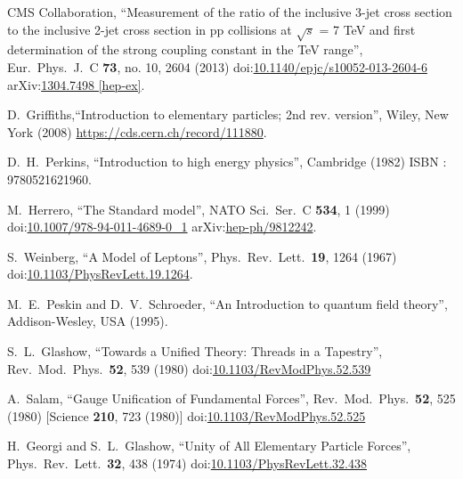 \begin{thebibliography}{99}

CMS Collaboration, ``Measurement of the ratio of the inclusive 3-jet cross section to the inclusive 2-jet cross section in pp collisions at $\sqrt{s}$ = 7 TeV and first determination of the strong coupling constant in the TeV range'', Eur.\ Phys.\ J.\ C {\bf 73}, no. 10, 2604 (2013) doi:\href{http://dx.doi.org/10.1140/epjc/s10052-013-2604-6}{10.1140/epjc/s10052-013-2604-6} arXiv:\href{https://arxiv.org/abs/1304.7498}{1304.7498 [hep-ex]}.


D.~Griffiths,``Introduction to elementary particles; 2nd rev. version'', Wiley, New York (2008) \url{https://cds.cern.ch/record/111880}.

D.~H.~Perkins, ``Introduction to high energy physics'', Cambridge (1982) ISBN : 9780521621960. 

M.~Herrero, ``The Standard model'', NATO Sci.\ Ser.\ C {\bf 534}, 1 (1999) doi:\href{  http://dx.doi.org/10.1007/978-94-011-4689-0\_1}{10.1007/978-94-011-4689-0\_1} arXiv:\href{  https://arxiv.org/abs/hep-ph/9812242}{hep-ph/9812242}.

S.~Weinberg, ``A Model of Leptons'', Phys.\ Rev.\ Lett.\  {\bf 19}, 1264 (1967) doi:\href{  http://dx.doi.org/10.1103/PhysRevLett.19.1264}{10.1103/PhysRevLett.19.1264}.

M.~E.~Peskin and D.~V.~Schroeder, ``An Introduction to quantum field theory'', Addison-Wesley, USA (1995).

S.~L.~Glashow, ``Towards a Unified Theory: Threads in a Tapestry'', Rev.\ Mod.\ Phys.\  {\bf 52}, 539 (1980) doi:\href{http://dx.doi.org/10.1103/RevModPhys.52.539}{10.1103/RevModPhys.52.539}

A.~Salam, ``Gauge Unification of Fundamental Forces'', Rev.\ Mod.\ Phys.\  {\bf 52}, 525 (1980) [Science {\bf 210}, 723 (1980)] doi:\href{http://dx.doi.org/10.1103/RevModPhys.52.525}{10.1103/RevModPhys.52.525}

H.~Georgi and S.~L.~Glashow, ``Unity of All Elementary Particle Forces'', Phys.\ Rev.\ Lett.\  {\bf 32}, 438 (1974) doi:\href{http://dx.doi.org/10.1103/PhysRevLett.32.438}{10.1103/PhysRevLett.32.438}


\end{thebibliography}
